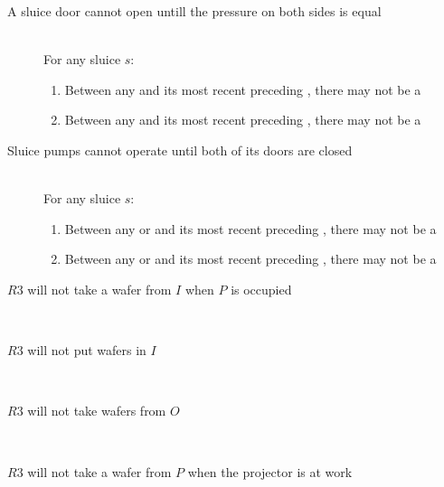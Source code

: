 \begin{description}
 \item[A sluice door cannot open untill the pressure on both sides is equal] \hfill \\
 For any sluice $s$:
 \begin{enumerate}
  \item Between any  and its most recent preceding , there may not be a 
  \item Between any  and its most recent preceding , there may not be a 
 \end{enumerate}

 \item[Sluice pumps cannot operate until both of its doors are closed] \hfill \\
 For any sluice $s$:
 \begin{enumerate}
  \item Between any  or  and its most recent preceding , there may not be a 
  \item Between any  or  and its most recent preceding , there may not be a 
 \end{enumerate}

 \item[$R3$ will not take a wafer from $I$ when $P$ is occupied] \hfill \\
 
 \item[$R3$ will not put wafers in $I$] \hfill \\
 
 \item[$R3$ will not take wafers from $O$] \hfill \\
 
 \item[$R3$ will not take a wafer from $P$ when the projector is at work] \hfill \\
 
 
 
\end{description}
